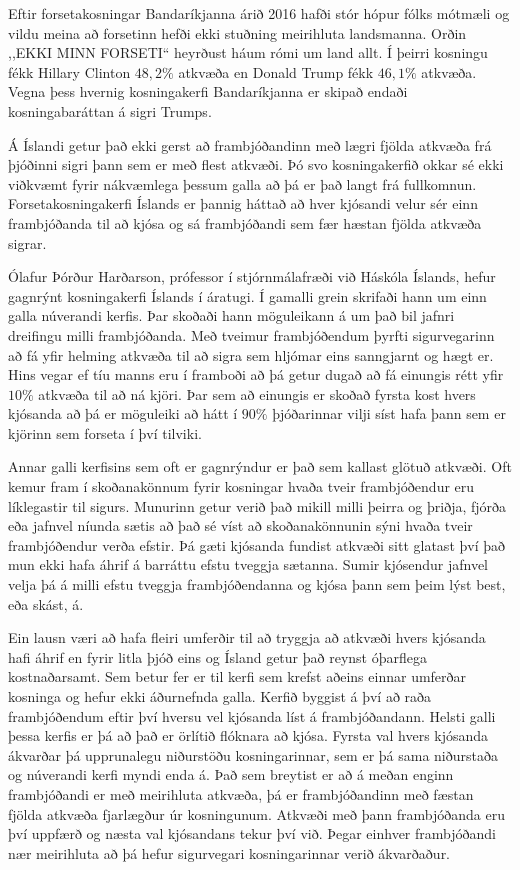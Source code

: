 Eftir forsetakosningar Bandaríkjanna árið 2016 hafði stór hópur fólks mótmæli og vildu meina að forsetinn hefði ekki stuðning meirihluta landsmanna.
Orðin ,,EKKI MINN FORSETI`` heyrðust háum rómi um land allt.
Í þeirri kosningu fékk Hillary Clinton $48{,}2\%$ atkvæða en Donald Trump fékk $46{,}1\%$ atkvæða.
Vegna þess hvernig kosningakerfi Bandaríkjanna er skipað endaði kosningabaráttan á sigri Trumps.

Á Íslandi getur það ekki gerst að frambjóðandinn með lægri fjölda atkvæða frá þjóðinni sigri þann sem er með flest atkvæði.
Þó svo kosningakerfið okkar sé ekki viðkvæmt fyrir nákvæmlega þessum galla að þá er það langt frá fullkomnun.
Forsetakosningakerfi Íslands er þannig háttað að hver kjósandi velur sér einn frambjóðanda til að kjósa og sá frambjóðandi
sem fær hæstan fjölda atkvæða sigrar.

Ólafur Þórður Harðarson, prófessor í stjórnmálafræði við Háskóla Íslands, hefur gagnrýnt kosningakerfi Íslands í áratugi.
Í gamalli grein skrifaði hann um einn galla núverandi kerfis.
Þar skoðaði hann möguleikann á um það bil jafnri dreifingu milli frambjóðanda.
Með tveimur frambjóðendum þyrfti sigurvegarinn að fá yfir helming atkvæða til að sigra sem hljómar eins sanngjarnt og hægt er.
Hins vegar ef tíu manns eru í framboði að þá getur dugað að fá einungis rétt yfir $10\%$ atkvæða til að ná kjöri.
Þar sem að einungis er skoðað fyrsta kost hvers kjósanda að þá er möguleiki að hátt í $90\%$ þjóðarinnar vilji síst hafa þann sem er kjörinn sem forseta í því tilviki.

Annar galli kerfisins sem oft er gagnrýndur er það sem kallast glötuð atkvæði.
Oft kemur fram í skoðanakönnum fyrir kosningar hvaða tveir frambjóðendur eru líklegastir til sigurs.
Munurinn getur verið það mikill milli þeirra og þriðja, fjórða eða jafnvel níunda sætis að það sé víst að skoðanakönnunin sýni hvaða tveir frambjóðendur verða efstir.
Þá gæti kjósanda fundist atkvæði sitt glatast því það mun ekki hafa áhrif á barráttu efstu tveggja sætanna.
Sumir kjósendur jafnvel velja þá á milli efstu tveggja frambjóðendanna og kjósa þann sem þeim lýst best, eða skást, á.

Ein lausn væri að hafa fleiri umferðir til að tryggja að atkvæði hvers kjósanda hafi áhrif en fyrir litla þjóð eins og Ísland getur það reynst óþarflega kostnaðarsamt.
Sem betur fer er til kerfi sem krefst aðeins einnar umferðar kosninga og hefur ekki áðurnefnda galla.
Kerfið byggist á því að raða frambjóðendum eftir því hversu vel kjósanda líst á frambjóðandann.
Helsti galli þessa kerfis er þá að það er örlítið flóknara að kjósa.
Fyrsta val hvers kjósanda ákvarðar þá upprunalegu niðurstöðu kosningarinnar, sem er þá sama niðurstaða og núverandi kerfi myndi enda á.
Það sem breytist er að á meðan enginn frambjóðandi er með meirihluta atkvæða, þá er frambjóðandinn með fæstan fjölda atkvæða fjarlægður úr kosningunum.
Atkvæði með þann frambjóðanda eru því uppfærð og næsta val kjósandans tekur því við.
Þegar einhver frambjóðandi nær meirihluta að þá hefur sigurvegari kosningarinnar verið ákvarðaður.

